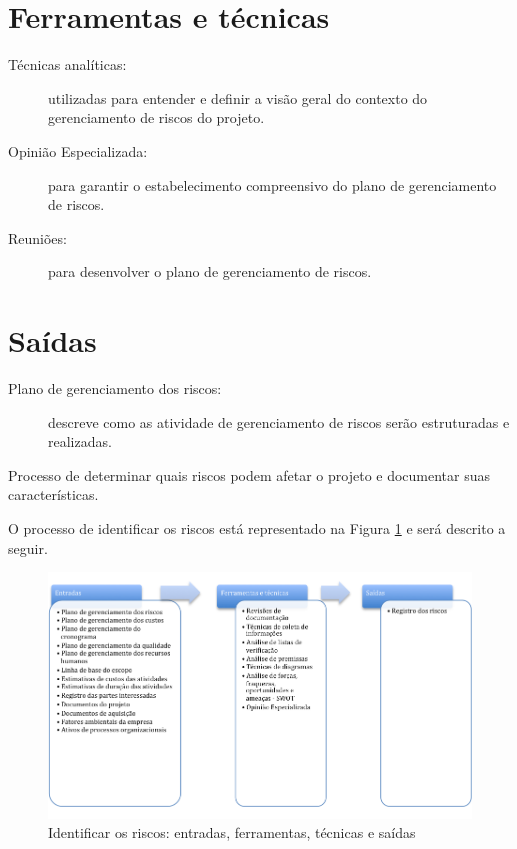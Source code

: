 \section{Ferramentas e técnicas}

\begin{description}

	\item[Técnicas analíticas:] utilizadas para entender e definir a visão geral do contexto do gerenciamento de riscos do projeto.
	
	\item[Opinião Especializada:] para garantir o estabelecimento compreensivo do plano de gerenciamento de riscos.
	
	\item[Reuniões:] para desenvolver o plano de gerenciamento de riscos.
	
\end{description}

\section{Saídas}

\begin{description}
	
	\item[Plano de gerenciamento dos riscos:] descreve como as atividade de gerenciamento de riscos serão estruturadas e realizadas.
	
\end{description}


Processo de determinar quais riscos podem afetar o projeto e documentar suas características.

O processo de identificar os riscos está representado na Figura \ref{fig:riscos:ident:efts} e será descrito a seguir.

\begin{figure}[!h]
	\centering
	\includegraphics[scale=0.5]{Figuras/riscos_efts_identificar.png}
	\caption{Identificar os riscos: entradas, ferramentas, técnicas e saídas}
	\label{fig:riscos:ident:efts}
\end{figure}

